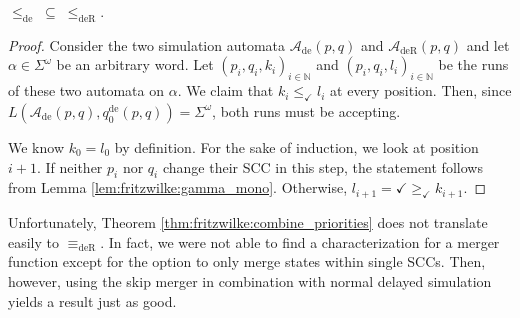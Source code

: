 \begin{lem}
	$\leq_\text{de} \;\subseteq\; \leq_\text{deR}$.
\end{lem}

\begin{proof} 
	Consider the two simulation automata $\mathcal{A}_\text{de}(p, q)$ and $\mathcal{A}_\text{deR}(p, q)$ and let $\alpha \in \Sigma^\omega$ be an arbitrary word. Let $(p_i, q_i, k_i)_{i \in \mathbb{N}}$ and $(p_i, q_i, l_i)_{i \in \mathbb{N}}$ be the runs of these two automata on $\alpha$. We claim that $k_i \leq_\checkmark l_i$ at every position. Then, since $L(\mathcal{A}_\text{de}(p, q), q_0^\text{de}(p, q)) = \Sigma^\omega$, both runs must be accepting.
	
	We know $k_0 = l_0$ by definition. For the sake of induction, we look at position $i+1$. If neither $p_i$ nor $q_i$ change their SCC in this step, the statement follows from Lemma \ref{lem:fritzwilke:gamma_mono}. Otherwise, $l_{i+1} = \checkmark \geq_\checkmark k_{i+1}$.
\end{proof}

\vspace{5pt}

Unfortunately, Theorem \ref{thm:fritzwilke:combine_priorities} does not translate easily to $\equiv_\text{deR}$. In fact, we were not able to find a characterization for a merger function except for the option to only merge states within single SCCs. Then, however, using the skip merger in combination with normal delayed simulation yields a result just as good.




















